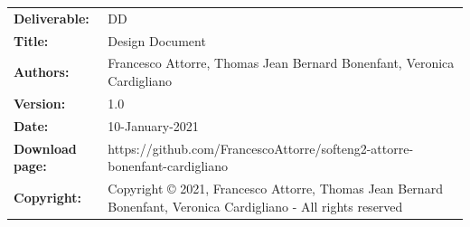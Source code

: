 \begin{table}[h!]
\begin{tabu} to \textwidth { X[0.3,r,p] X[0.7,l,p] }
\hline

\textbf{Deliverable:} & DD\\
\textbf{Title:} & Design Document \\
\textbf{Authors:} & Francesco Attorre, Thomas Jean Bernard Bonenfant, Veronica Cardigliano \\
\textbf{Version:} & 1.0 \\ 
\textbf{Date:} & 10-January-2021 \\
\textbf{Download page:} & https://github.com/FrancescoAttorre/softeng2-attorre-bonenfant-cardigliano \\
\textbf{Copyright:} & Copyright © 2021, Francesco Attorre, Thomas Jean Bernard Bonenfant, Veronica Cardigliano - All rights reserved \\
\hline
\end{tabu}
\end{table}

\setcounter{page}{2}


\newpage

\hypersetup{linkcolor = black}
\tableofcontents

\newpage

\clearpage
{}
\label{sect:introduction}


\clearpage
{}
\label{sect:architecturalDesign}


